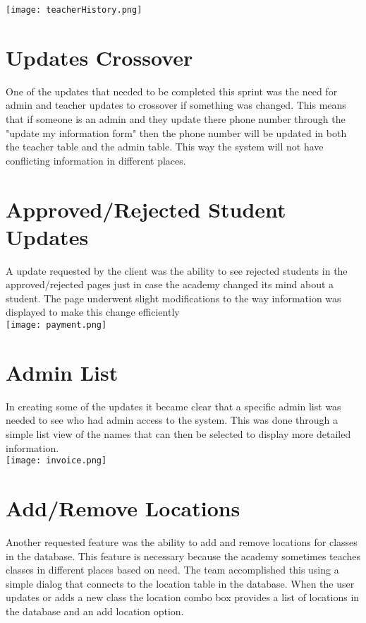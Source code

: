 \documentclass[11pt]{book}
\begin{document}
\texttt{[image: teacherHistory.png]}

\section{Updates Crossover}
One of the updates that needed to be completed this sprint was the need for admin and teacher updates to crossover if something was changed. This means that if someone is an admin and they update there phone number through the "update my information form" then the phone number will be updated in both the teacher table and the admin table. This way the system will not have conflicting information in different places. 

\section{Approved/Rejected Student Updates}
A update requested by the client was the ability to see rejected students in the approved/rejected pages just in case the academy changed its mind about a student. The page underwent slight modifications to the way information was displayed to make this change efficiently\\

\texttt{[image: payment.png]}

\section{Admin List}
In creating some of the updates it became clear that a specific admin list was needed to see who had admin access to the system. This was done through a simple list view of the names that can then be selected to display more detailed information.\\
\texttt{[image: invoice.png]}

\section{Add/Remove Locations}
Another requested feature was the ability to add and remove locations for classes in the database. This feature is necessary because the academy sometimes teaches classes in different places based on need. The team accomplished this using a simple dialog that connects to the location table in the database. When the user updates or adds a new class the location combo box provides a list of locations in the database and an add location option.\\
\end{document}
